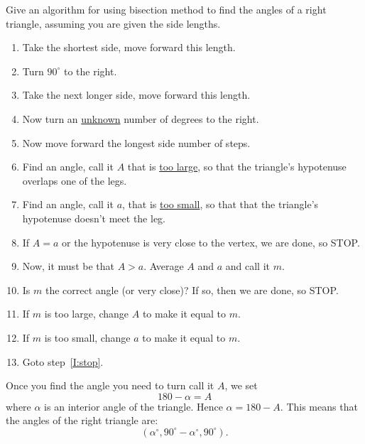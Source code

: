 \documentclass[noauthor,nooutcomes,12pt]{ximera}
\begin{document}
\begin{question}
  Give an algorithm for using bisection method to find the angles of a
  right triangle, assuming you are given the side lengths.
  \begin{freeResponse}
    \begin{enumerate}
    \item Take the shortest side, move forward this length.
    \item Turn $90^\circ$ to the right.
    \item Take the next longer side, move forward this length.
    \item Now turn an \underline{unknown} number of degrees to the right.
    \item Now move forward the longest side number of steps.
    \item Find an angle, call it $A$ that is \underline{too large}, so
      that the triangle's hypotenuse overlaps one of the legs.
    \item Find an angle, call it $a$, that is \underline{too small},
      so that that the triangle's hypotenuse doesn't meet the leg.
    \item\label{I:stop} If $A=a$ or the hypotenuse is very close to
      the vertex, we are done, so STOP.
    \item Now, it must be that $A>a$. Average $A$ and $a$ and call it $m$.
    \item Is $m$ the correct angle (or very close)? If so, then we are done, so STOP.
    \item If $m$ is too large, change $A$ to make it equal to $m$.
    \item If $m$ is too small, change $a$ to make it equal to $m$.
    \item Goto step~\ref{I:stop}.
    \end{enumerate}
    Once you find the angle you need to turn call it $A$, we set
    \[
    180-\alpha = A
    \]
    where $\alpha$ is an interior angle of the triangle.  Hence
    $\alpha = 180-A$. This means that the angles of the right triangle
    are:
    \[
    (\alpha^\circ,90^\circ-\alpha^\circ,90^\circ).
    \]
  \end{freeResponse}
\end{question}
\end{document}
